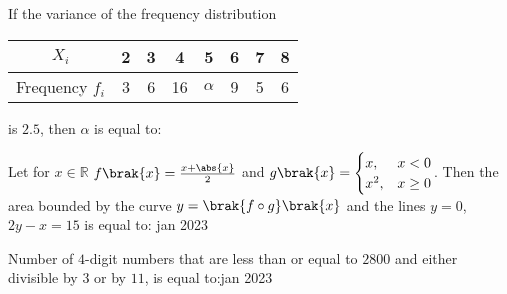         
    \item If the variance of the frequency distribution
    \begin{tabular}{|c|c|c|c|c|c|c|c|}
    \hline
    $X_{i}$ & 2 & 3 & 4 & 5 & 6 & 7 & 8 \\ \hline
    Frequency $f_{i}$ & 3 & 6 & 16 & $\alpha$ & 9 & 5 & 6 \\ \hline
    \end{tabular}
    is $2.5$, then $\alpha$ is equal to:
    
       

    \item Let for $x\in\mathbb{R}$
     $f\brak{x}=\frac{x+\abs{x}}{2}$
     and $g\brak{x}=
     \begin{cases}
     x, & x<0 \\
     x^{2}, & x\geq0
     \end{cases}$.
     Then the area bounded by the curve $y=\brak{f\circ g}\brak{x}$ and the lines $y=0$, $2y-x=15$ is equal to: \hfill{jan 2023}
    

    \item Number of $4$-digit numbers that are less than or equal to $2800$ and either divisible by $3$ or by $11$, is equal to:\hfill{jan 2023}
